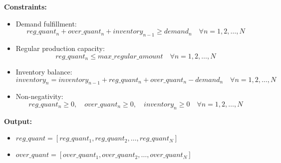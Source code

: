 \documentclass{article}
\begin{document}
\textbf{Constraints:}
\begin{itemize}
    \item Demand fulfillment: 
    \begin{equation}
    reg\_quant_{n} + over\_quant_{n} + inventory_{n-1} \geq demand_{n} \quad \forall n = 1, 2, \ldots, N
    \end{equation}
    
    \item Regular production capacity:
    \begin{equation}
    reg\_quant_{n} \leq max\_regular\_amount \quad \forall n = 1, 2, \ldots, N
    \end{equation}
    
    \item Inventory balance:
    \begin{equation}
    inventory_{n} = inventory_{n-1} + reg\_quant_{n} + over\_quant_{n} - demand_{n} \quad \forall n = 1, 2, \ldots, N
    \end{equation}
    
    \item Non-negativity:
    \begin{equation}
    reg\_quant_{n} \geq 0, \quad over\_quant_{n} \geq 0, \quad inventory_{n} \geq 0 \quad \forall n = 1, 2, \ldots, N
    \end{equation}
\end{itemize}

\textbf{Output:}
\begin{itemize}
    \item $reg\_quant = [reg\_quant_{1}, reg\_quant_{2}, \ldots, reg\_quant_{N}]$
    \item $over\_quant = [over\_quant_{1}, over\_quant_{2}, \ldots, over\_quant_{N}]$
\end{itemize}
\end{document}
